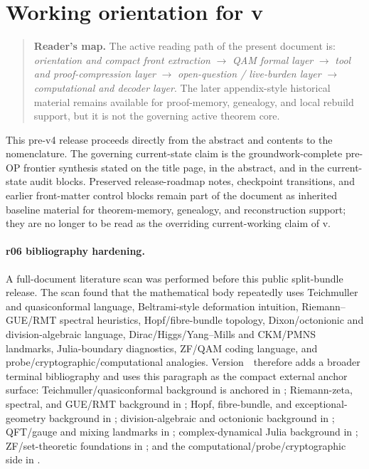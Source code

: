 \section*{Working orientation for v\docversion}
\begin{quote}\small
\noindent\textbf{Reader's map.} The active reading path of the present document is: \emph{orientation and compact front extraction} $\to$ \emph{QAM formal layer} $\to$ \emph{tool and proof-compression layer} $\to$ \emph{open-question / live-burden layer} $\to$ \emph{computational and decoder layer}. The later appendix-style historical material remains available for proof-memory, genealogy, and local rebuild support, but it is not the governing active theorem core.
\end{quote}
This pre-v4 release proceeds directly from the abstract and contents to the nomenclature. The governing current-state claim is the groundwork-complete pre-OP frontier synthesis stated on the title page, in the abstract, and in the current-state audit blocks. Preserved release-roadmap notes, checkpoint transitions, and earlier front-matter control blocks remain part of the document as inherited baseline material for theorem-memory, genealogy, and reconstruction support; they are no longer to be read as the overriding current-working claim of v\docversion.

\paragraph{r06 bibliography hardening.}
A full-document literature scan was performed before this public split-bundle release. The scan found that the mathematical body repeatedly uses Teichmuller and quasiconformal language, Beltrami-style deformation intuition, Riemann--GUE/RMT spectral heuristics, Hopf/fibre-bundle topology, Dixon/octonionic and division-algebraic language, Dirac/Higgs/Yang--Mills and CKM/PMNS landmarks, Julia-boundary diagnostics, ZF/QAM coding language, and probe/cryptographic/computational analogies. Version~\docversion\ therefore adds a broader terminal bibliography and uses this paragraph as the compact external anchor surface: Teichmuller/quasiconformal background is anchored in \cite{Ahlfors2006,GardinerLakic2000,Hubbard2006,Sullivan1985}; Riemann-zeta, spectral, and GUE/RMT background in \cite{Riemann1859,Edwards1974,Titchmarsh1986,Conrey2003,Montgomery1973,Odlyzko1987,Mehta2004,KatzSarnak1999}; Hopf, fibre-bundle, and exceptional-geometry background in \cite{Hopf1931,Steenrod1951,Hatcher2002,Bryant1987,EguchiGilkeyHanson1980}; division-algebraic and octonionic background in \cite{Baez2002,Dixon1994,Furey2018}; QFT/gauge and mixing landmarks in \cite{Dirac1928,YangMills1954,EnglertBrout1964,Higgs1964,Cabibbo1963,KobayashiMaskawa1973,MakiNakagawaSakata1962}; complex-dynamical Julia background in \cite{Milnor2006}; ZF/set-theoretic foundations in \cite{Zermelo1908,Fraenkel1928,Jech2003,Kunen1980}; and the computational/probe/cryptographic side in \cite{Turing1936,Kasiski1863,RivestShamirAdleman1978,DiffieHellman1976,Norris1997,Glasserman2004,Bollerslev1986,Knuth1997,Rojas1998,Copeland2006}.

